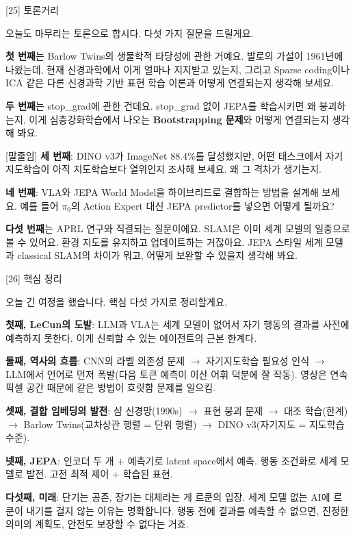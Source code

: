 \documentclass[aspectratio=169,10pt]{beamer}
\newenvironment{script}{%
  \footnotesize
  \setlength{\parskip}{0.5em}
  \setlength{\parindent}{0pt}
}{}
\begin{document}
\begin{frame}{[25] 토론거리}
\begin{script}
오늘도 마무리는 토론으로 합시다. 다섯 가지 질문을 드릴게요.

\textbf{첫 번째}는 Barlow Twins의 생물학적 타당성에 관한 거예요. 발로의 가설이 1961년에 나왔는데, 현재 신경과학에서 이게 얼마나 지지받고 있는지, 그리고 Sparse coding이나 ICA 같은 다른 신경과학 기반 표현 학습 이론과 어떻게 연결되는지 생각해 보세요.

\textbf{두 번째}는 stop\_grad에 관한 건데요. stop\_grad 없이 JEPA를 학습시키면 왜 붕괴하는지, 이게 심층강화학습에서 나오는 \textbf{Bootstrapping 문제}와 어떻게 연결되는지 생각해 봐요.

[말줄임] \textbf{세 번째}: DINO v3가 ImageNet 88.4\%를 달성했지만, 어떤 태스크에서 자기지도학습이 아직 지도학습보다 열위인지 조사해 보세요. 왜 그 격차가 생기는지.

\textbf{네 번째}: VLA와 JEPA World Model을 하이브리드로 결합하는 방법을 설계해 보세요. 예를 들어 $\pi_0$의 Action Expert 대신 JEPA predictor를 넣으면 어떻게 될까요?

\textbf{다섯 번째}는 APRL 연구와 직결되는 질문이에요. SLAM은 이미 세계 모델의 일종으로 볼 수 있어요. 환경 지도를 유지하고 업데이트하는 거잖아요. JEPA 스타일 세계 모델과 classical SLAM의 차이가 뭐고, 어떻게 보완할 수 있을지 생각해 봐요.
\end{script}
\end{frame}

\begin{frame}{[26] 핵심 정리}
\begin{script}
오늘 긴 여정을 했습니다. 핵심 다섯 가지로 정리할게요.

\textbf{첫째, LeCun의 도발}: LLM과 VLA는 세계 모델이 없어서 자기 행동의 결과를 사전에 예측하지 못한다. 이게 신뢰할 수 있는 에이전트의 근본 한계다.

\textbf{둘째, 역사의 흐름}: CNN의 라벨 의존성 문제 $\to$ 자기지도학습 필요성 인식 $\to$ LLM에서 언어로 먼저 폭발(다음 토큰 예측이 이산 어휘 덕분에 잘 작동). 영상은 연속 픽셀 공간 때문에 같은 방법이 흐릿함 문제를 일으킴.

\textbf{셋째, 결합 임베딩의 발전}: 샴 신경망(1990s) $\to$ 표현 붕괴 문제 $\to$ 대조 학습(한계) $\to$ Barlow Twins(교차상관 행렬 = 단위 행렬) $\to$ DINO v3(자기지도 = 지도학습 수준).

\textbf{넷째, JEPA}: 인코더 두 개 + 예측기로 latent space에서 예측. 행동 조건화로 세계 모델로 발전. 고전 최적 제어 + 학습된 표현.

\textbf{다섯째, 미래}: 단기는 공존, 장기는 대체라는 게 르쿤의 입장. 세계 모델 없는 AI에 르쿤이 내기를 걸지 않는 이유는 명확합니다. 행동 전에 결과를 예측할 수 없으면, 진정한 의미의 계획도, 안전도 보장할 수 없다는 거죠.
\end{script}
\end{frame}
\end{document}
